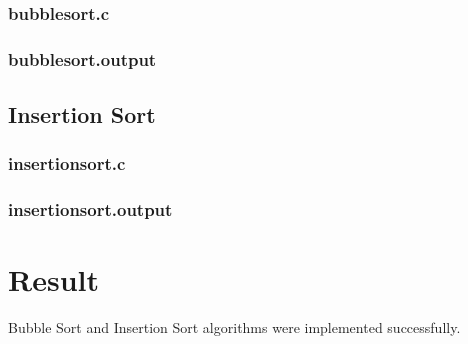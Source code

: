 \subsubsection{bubblesort.c}



\subsubsection{bubblesort.output}



\subsection{Insertion Sort}

\subsubsection{insertionsort.c}



\subsubsection{insertionsort.output}



\section{Result}
Bubble Sort and Insertion Sort algorithms were implemented successfully.